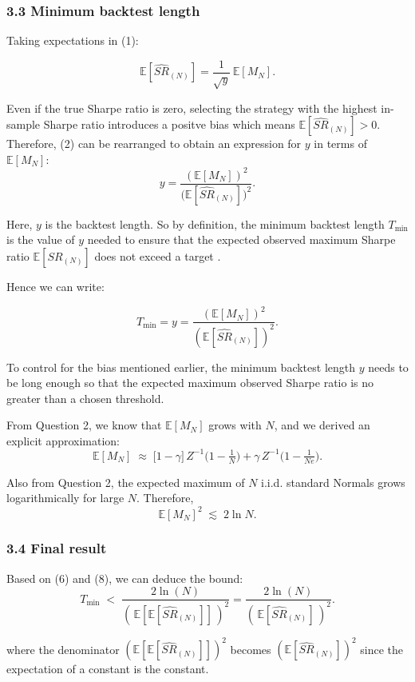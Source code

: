\documentclass[
  12pt,
]{article}
\begin{document}
\subsubsection{3.3 Minimum backtest
length}\label{minimum-backtest-length}

Taking expectations in (1):

\[
\mathbb{E}[\widehat{SR}_{(N)}] = \frac{1}{\sqrt{y}}\,\mathbb{E}[M_N]. \tag{4}
\]

Even if the true Sharpe ratio is zero, selecting the strategy with the
highest in-sample Sharpe ratio introduces a positve bias which means
\(\mathbb{E}[\widehat{SR}_{(N)}] > 0\). Therefore, (2) can be rearranged
to obtain an expression for \(y\) in terms of \(\mathbb{E}[M_N]\): \[
y = \frac{(\mathbb{E}[M_N])^2}{\big(\mathbb{E}[\widehat{SR}_{(N)}]\big)^2}. \tag{5}
\]

Here, \(y\) is the backtest length. So by definition, the minimum
backtest length \(T_{\min}\) is the value of \(y\) needed to ensure that
the expected observed maximum Sharpe ratio
\(\mathbb{E}[\widehat{SR}_{(N)}]\) does not exceed a target .

Hence we can write:

\[
T_{\min} = y = \frac{(\mathbb{E}[M_N])^2}{(\mathbb{E}[\widehat{SR}_{(N)}])^2} \tag{6}.
\]

To control for the bias mentioned earlier, the minimum backtest length
\(y\) needs to be long enough so that the expected maximum observed
Sharpe ratio is no greater than a chosen threshold.

From Question 2, we know that \(\mathbb{E}[M_N]\) grows with \(N\), and
we derived an explicit approximation: \[
\mathbb{E}[M_N] \;\approx\; \big[1 - \gamma\big]\,Z^{-1}\!\Big(1-\tfrac{1}{N}\Big)
+ \gamma\,Z^{-1}\!\Big(1-\tfrac{1}{Ne}\Big). \tag{7}
\]

Also from Question 2, the expected maximum of \(N\) i.i.d. standard
Normals grows logarithmically for large \(N\). Therefore, \[
\mathbb{E}[M_N]^2 \;\lesssim\; 2\ln N. \tag{8}
\]

\subsubsection{3.4 Final result}\label{final-result}

Based on (6) and (8), we can deduce the bound:\[
T_{\min} \;<\; \frac{2\ln(N)}{(\,\mathbb{E}[\mathbb{E}[\widehat{SR}_{(N)}]]\,)^2}=\frac{2\ln(N)}{(\,\mathbb{E}[\widehat{SR}_{(N)}]\,)^2}. \tag{9}
\]

where the denominator \((\mathbb{E}[\mathbb{E}[\widehat{SR}_{(N)}]])^2\)
becomes \((\mathbb{ E}[\widehat{SR}_{(N)}])^2\) since the expectation of
a constant is the constant.
\end{document}
